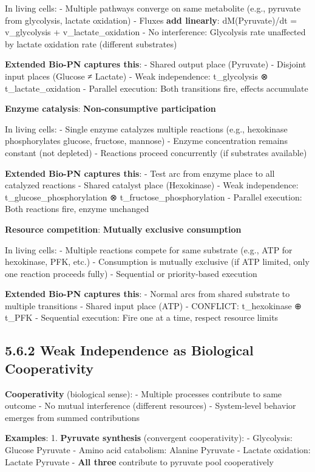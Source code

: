 In living cells: - Multiple pathways converge on same metabolite (e.g.,
pyruvate from glycolysis, lactate oxidation) - Fluxes \textbf{add
linearly}: dM(Pyruvate)/dt = v\_glycolysis + v\_lactate\_oxidation - No
interference: Glycolysis rate unaffected by lactate oxidation rate
(different substrates)

\textbf{Extended Bio-PN captures this}: - Shared output place (Pyruvate)
- Disjoint input places (Glucose ≠ Lactate) - Weak independence:
t\_glycolysis ⊗ t\_lactate\_oxidation - Parallel execution: Both
transitions fire, effects accumulate

\textbf{Enzyme catalysis}: \textbf{Non-consumptive participation}

In living cells: - Single enzyme catalyzes multiple reactions (e.g.,
hexokinase phosphorylates glucose, fructose, mannose) - Enzyme
concentration remains constant (not depleted) - Reactions proceed
concurrently (if substrates available)

\textbf{Extended Bio-PN captures this}: - Test arc from enzyme place to
all catalyzed reactions - Shared catalyst place (Hexokinase) - Weak
independence: t\_glucose\_phosphorylation ⊗ t\_fructose\_phosphorylation
- Parallel execution: Both reactions fire, enzyme unchanged

\textbf{Resource competition}: \textbf{Mutually exclusive consumption}

In living cells: - Multiple reactions compete for same substrate (e.g.,
ATP for hexokinase, PFK, etc.) - Consumption is mutually exclusive (if
ATP limited, only one reaction proceeds fully) - Sequential or
priority-based execution

\textbf{Extended Bio-PN captures this}: - Normal arcs from shared
substrate to multiple transitions - Shared input place (ATP) - CONFLICT:
t\_hexokinase ⊕ t\_PFK - Sequential execution: Fire one at a time,
respect resource limits

\hypertarget{weak-independence-as-biological-cooperativity}{%
\subsection{5.6.2 Weak Independence as Biological
Cooperativity}\label{weak-independence-as-biological-cooperativity}}

\textbf{Cooperativity} (biological sense): - Multiple processes
contribute to same outcome - No mutual interference (different
resources) - System-level behavior emerges from summed contributions

\textbf{Examples}: 1. \textbf{Pyruvate synthesis} (convergent
cooperativity): - Glycolysis: Glucose \textrightarrow Pyruvate - Amino acid
catabolism: Alanine \textrightarrow Pyruvate - Lactate oxidation: Lactate \textrightarrow Pyruvate -
\textbf{All three} contribute to pyruvate pool cooperatively

